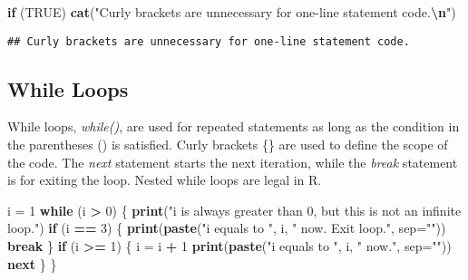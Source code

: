 \documentclass[
  12pt,
]{article}
\newenvironment{Shaded}{\begin{snugshade}}{\end{snugshade}}
\newcommand{\AttributeTok}[1]{\textcolor[rgb]{0.13,0.29,0.53}{#1}}
\newcommand{\ConstantTok}[1]{\textcolor[rgb]{0.56,0.35,0.01}{#1}}
\newcommand{\ControlFlowTok}[1]{\textcolor[rgb]{0.13,0.29,0.53}{\textbf{#1}}}
\newcommand{\DecValTok}[1]{\textcolor[rgb]{0.00,0.00,0.81}{#1}}
\newcommand{\FunctionTok}[1]{\textcolor[rgb]{0.13,0.29,0.53}{\textbf{#1}}}
\newcommand{\NormalTok}[1]{#1}
\newcommand{\OtherTok}[1]{\textcolor[rgb]{0.56,0.35,0.01}{#1}}
\newcommand{\SpecialCharTok}[1]{\textcolor[rgb]{0.81,0.36,0.00}{\textbf{#1}}}
\newcommand{\StringTok}[1]{\textcolor[rgb]{0.31,0.60,0.02}{#1}}
\begin{document}
\begin{Shaded}
\begin{Highlighting}[]
\ControlFlowTok{if}\NormalTok{ (}\ConstantTok{TRUE}\NormalTok{) }
  \FunctionTok{cat}\NormalTok{(}\StringTok{"Curly brackets are unnecessary for one{-}line statement code.}\SpecialCharTok{\textbackslash{}n}\StringTok{"}\NormalTok{)}
\end{Highlighting}
\end{Shaded}

\begin{verbatim}
## Curly brackets are unnecessary for one-line statement code.
\end{verbatim}

\subsection{While Loops}
\label{sec:BRS-while}

While loops, \textit{while()}, are used for repeated statements as long
as the condition in the parentheses () is satisfied. Curly brackets \{\}
are used to define the scope of the code. The \textit{next} statement
starts the next iteration, while the \textit{break} statement is for
exiting the loop. Nested while loops are legal in R.

\begin{Shaded}
\begin{Highlighting}[]
\NormalTok{i }\OtherTok{=} \DecValTok{1}
\ControlFlowTok{while}\NormalTok{ (i }\SpecialCharTok{\textgreater{}} \DecValTok{0}\NormalTok{) \{}
  \FunctionTok{print}\NormalTok{(}\StringTok{"i is always greater than 0, but this is not an infinite loop."}\NormalTok{)}
  \ControlFlowTok{if}\NormalTok{ (i }\SpecialCharTok{==} \DecValTok{3}\NormalTok{) \{}
    \FunctionTok{print}\NormalTok{(}\FunctionTok{paste}\NormalTok{(}\StringTok{"i equals to "}\NormalTok{, i, }\StringTok{" now. Exit loop."}\NormalTok{, }\AttributeTok{sep=}\StringTok{""}\NormalTok{))}
    \ControlFlowTok{break}
\NormalTok{  \}}
  \ControlFlowTok{if}\NormalTok{ (i }\SpecialCharTok{\textgreater{}=} \DecValTok{1}\NormalTok{) \{}
\NormalTok{    i }\OtherTok{=}\NormalTok{ i }\SpecialCharTok{+} \DecValTok{1}
    \FunctionTok{print}\NormalTok{(}\FunctionTok{paste}\NormalTok{(}\StringTok{"i equals to "}\NormalTok{, i, }\StringTok{" now."}\NormalTok{, }\AttributeTok{sep=}\StringTok{""}\NormalTok{))}
    \ControlFlowTok{next} 
\NormalTok{  \}}
\NormalTok{\}}
\end{Highlighting}
\end{Shaded}
\end{document}

